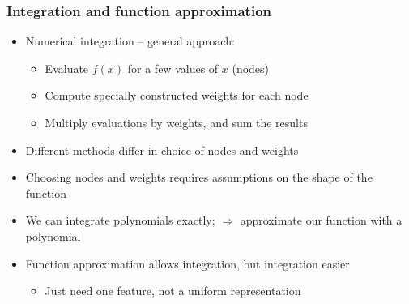 \documentclass[bigger,handout]{beamer}
\begin{document}
\begin{frame}%
\frametitle{Integration and function approximation}

\begin{itemize}
\item Numerical integration -- general approach:

\begin{itemize}
\item Evaluate $f\left( x\right) $ for a few values of $x$ (nodes)

\item Compute specially constructed weights for each node

\item Multiply evaluations by weights, and sum the results
\end{itemize}

\item Different methods differ in choice of nodes and weights

\item Choosing nodes and weights requires assumptions \newline
on the shape of the function

\item We can integrate polynomials exactly;\newline
$\Rightarrow $ approximate our function with a polynomial

\item Function approximation allows integration, but integration easier
\begin{itemize}
\item Just need one feature, not a uniform representation
\end{itemize}

\end{itemize}



\end{frame}%
\end{document}
